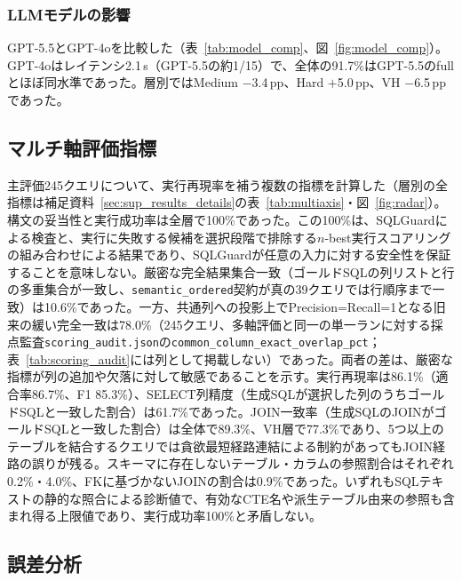 \documentclass[twocolumn]{interact}
\begin{document}
\subsubsection{LLMモデルの影響}
\label{sec:model_comparison}

GPT-5.5とGPT-4oを比較した（表~\ref{tab:model_comp}、図~\ref{fig:model_comp}）。GPT-4oはレイテンシ2.1\,s（GPT-5.5の約1/15）で、全体の91.7\%はGPT-5.5のfullとほぼ同水準であった。層別ではMedium $-$3.4\,pp、Hard $+$5.0\,pp、VH $-$6.5\,ppであった。


\subsection{マルチ軸評価指標}

\label{sec:multiaxis}

主評価245クエリについて、実行再現率を補う複数の指標を計算した（層別の全指標は補足資料~\ref{sec:sup_results_details}の表~\ref{tab:multiaxis}・図~\ref{fig:radar}）。構文の妥当性と実行成功率は全層で100\%であった。この100\%は、SQLGuardによる検査と、実行に失敗する候補を選択段階で排除する$n$-best実行スコアリングの組み合わせによる結果であり、SQLGuardが任意の入力に対する安全性を保証することを意味しない。厳密な完全結果集合一致（ゴールドSQLの列リストと行の多重集合が一致し、\texttt{semantic\_ordered}契約が真の39クエリでは行順序まで一致）は10.6\%であった。一方、共通列への投影上でPrecision=Recall=1となる旧来の緩い完全一致は78.0\%（245クエリ、多軸評価と同一の単一ランに対する採点監査\texttt{scoring\_audit.json}の\texttt{common\_column\_exact\_overlap\_pct}；表~\ref{tab:scoring_audit}には列として掲載しない）であった。両者の差は、厳密な指標が列の追加や欠落に対して敏感であることを示す。実行再現率は86.1\%（適合率86.7\%、F1 85.3\%）、SELECT列精度（生成SQLが選択した列のうちゴールドSQLと一致した割合）は61.7\%であった。JOIN一致率（生成SQLのJOINがゴールドSQLと一致した割合）は全体で89.3\%、VH層で77.3\%であり、5つ以上のテーブルを結合するクエリでは貪欲最短経路連結による制約があってもJOIN経路の誤りが残る。スキーマに存在しないテーブル・カラムの参照割合はそれぞれ0.2\%・4.0\%、FKに基づかないJOINの割合は0.9\%であった。いずれもSQLテキストの静的な照合による診断値で、有効なCTE名や派生テーブル由来の参照も含まれ得る上限値であり、実行成功率100\%と矛盾しない。
\subsection{誤差分析}
\label{sec:error_analysis}
\end{document}
